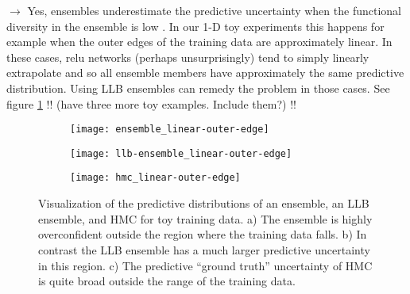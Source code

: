 \documentclass[../thesis.tex]{subfiles}
\begin{document}
$\rightarrow$ Yes, ensembles underestimate the predictive uncertainty when the functional diversity in the ensemble is low \parencite{yao2019quality}. In our 1-D toy experiments this happens for example when the outer edges of the training data are approximately linear. In these cases, relu networks (perhaps unsurprisingly) tend to simply linearly extrapolate and so all ensemble members have approximately the same predictive distribution. Using LLB ensembles can remedy the problem in those cases. See figure \ref{fig:linear-outer-edge} !! (have three more toy examples. Include them?) !!
\begin{figure}
    \centering
    \begin{subfigure}{\textwidth}
    \centering
    \texttt{[image: ensemble\_linear-outer-edge]} 

    \end{subfigure}

    \begin{subfigure}{\textwidth}
    \centering
    \texttt{[image: llb-ensemble\_linear-outer-edge]}
    \end{subfigure}

    \begin{subfigure}{\textwidth}
    \centering
    \texttt{[image: hmc\_linear-outer-edge]}
    \end{subfigure}

    \caption{Visualization of the predictive distributions of an ensemble, an LLB ensemble, and HMC for toy training data. a) The ensemble is highly overconfident outside the region where the training data falls. b) In contrast the LLB ensemble has a much larger predictive uncertainty in this region. c) The predictive ``ground truth'' uncertainty of HMC is quite broad outside the range of the training data.}
    \label{fig:linear-outer-edge}
\end{figure}
\end{document}
